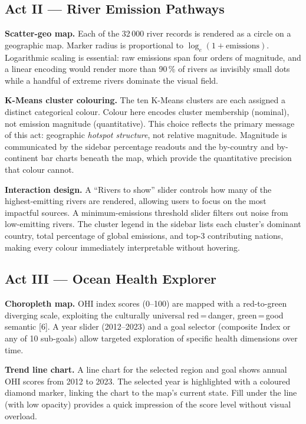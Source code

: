 \documentclass[10pt,twocolumn]{article}
\begin{document}
\subsection{Act II --- River Emission Pathways}

\textbf{Scatter-geo map.}
Each of the 32\,000 river records is rendered as a circle on a geographic
map.
Marker radius is proportional to $\log_{e}(1 + \text{emissions})$.
Logarithmic scaling is essential: raw emissions span four orders of magnitude,
and a linear encoding would render more than 90\,\% of rivers as
invisibly small dots while a handful of extreme rivers dominate the visual field.

\textbf{K-Means cluster colouring.}
The ten K-Means clusters are each assigned a distinct categorical colour.
Colour here encodes cluster membership (nominal), not emission magnitude
(quantitative).
This choice reflects the primary message of this act: geographic
\emph{hotspot structure}, not relative magnitude.
Magnitude is communicated by the sidebar percentage readouts and the
by-country and by-continent bar charts beneath the map, which provide the
quantitative precision that colour cannot.

\textbf{Interaction design.}
A ``Rivers to show'' slider controls how many of the highest-emitting rivers
are rendered, allowing users to focus on the most impactful sources.
A minimum-emissions threshold slider filters out noise from low-emitting
rivers.
The cluster legend in the sidebar lists each cluster's dominant country,
total percentage of global emissions, and top-3 contributing nations,
making every colour immediately interpretable without hovering.

\subsection{Act III --- Ocean Health Explorer}

\textbf{Choropleth map.}
OHI index scores (0--100) are mapped with a red-to-green diverging scale,
exploiting the culturally universal red\,=\,danger, green\,=\,good
semantic [6].
A year slider (2012--2023) and a goal selector (composite Index or any of
10 sub-goals) allow targeted exploration of specific health dimensions over
time.

\textbf{Trend line chart.}
A line chart for the selected region and goal shows annual OHI scores from
2012 to 2023.
The selected year is highlighted with a coloured diamond marker, linking the
chart to the map's current state.
Fill under the line (with low opacity) provides a quick impression of the
score level without visual overload.
\end{document}
